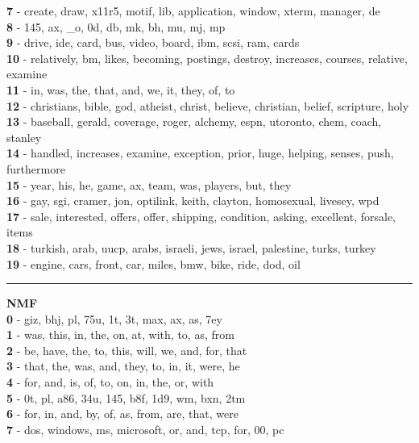 \textbf{7} - create, draw, x11r5, motif, lib, application, window, xterm, manager, de\\
\textbf{8} - 145, ax, \_o, 0d, db, mk, bh, mu, mj, mp\\
\textbf{9} - drive, ide, card, bus, video, board, ibm, scsi, ram, cards\\
\textbf{10} - relatively, bm, likes, becoming, postings, destroy, increases, courses, relative, examine\\
\textbf{11} - in, was, the, that, and, we, it, they, of, to\\
\textbf{12} - christians, bible, god, atheist, christ, believe, christian, belief, scripture, holy\\
\textbf{13} - baseball, gerald, coverage, roger, alchemy, espn, utoronto, chem, coach, stanley\\
\textbf{14} - handled, increases, examine, exception, prior, huge, helping, senses, push, furthermore\\
\textbf{15} - year, his, he, game, ax, team, was, players, but, they\\
\textbf{16} - gay, sgi, cramer, jon, optilink, keith, clayton, homosexual, livesey, wpd\\
\textbf{17} - sale, interested, offers, offer, shipping, condition, asking, excellent, forsale, items\\
\textbf{18} - turkish, arab, uucp, arabs, israeli, jews, israel, palestine, turks, turkey\\
\textbf{19} - engine, cars, front, car, miles, bmw, bike, ride, dod, oil\\
\hrule\vspace{2mm}
\noindent
\textbf{NMF}\vspace{2mm}\\
\vspace{2mm}
\noindent
\textbf{0} - giz, bhj, pl, 75u, 1t, 3t, max, ax, as, 7ey\\
\textbf{1} - was, this, in, the, on, at, with, to, as, from\\
\textbf{2} - be, have, the, to, this, will, we, and, for, that\\
\textbf{3} - that, the, was, and, they, to, in, it, were, he\\
\textbf{4} - for, and, is, of, to, on, in, the, or, with\\
\textbf{5} - 0t, pl, a86, 34u, 145, b8f, 1d9, wm, bxn, 2tm\\
\textbf{6} - for, in, and, by, of, as, from, are, that, were\\
\textbf{7} - dos, windows, ms, microsoft, or, and, tcp, for, 00, pc\\
